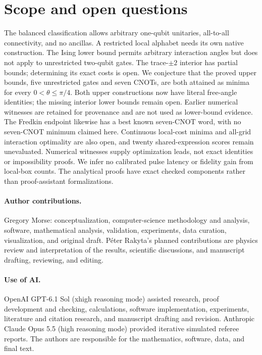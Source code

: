 \documentclass[a4paper,onecolumn,11pt,unpublished]{quantumarticle}
\begin{document}
\section{Scope and open questions}
The balanced classification allows arbitrary one-qubit unitaries, all-to-all
connectivity, and no ancillas. A restricted local alphabet needs its own
native construction. The Ising lower bound permits arbitrary interaction
angles but does not apply to unrestricted two-qubit gates. The trace-$\pm2$
interior has partial bounds; determining its exact costs is open.
We conjecture that the proved upper bounds, five unrestricted gates and
seven CNOTs, are both attained as minima for every $0<\theta\le\pi/4$.
Both upper constructions now have literal free-angle identities; the missing
interior lower bounds remain open. Earlier numerical witnesses are retained
for provenance and are not used as lower-bound evidence.
The Fredkin endpoint likewise has a best known seven-CNOT word, with no
seven-CNOT minimum claimed here.
Continuous local-cost minima and all-grid interaction optimality are also
open, and twenty shared-expression scores remain unevaluated. Numerical
witnesses supply optimization leads, not exact identities or impossibility
proofs. We infer no calibrated pulse latency or fidelity gain from local-box
counts. The analytical proofs have exact checked components rather than
proof-assistant formalizations.

\paragraph{Author contributions.}
Gregory Morse: conceptualization, computer-science methodology and analysis,
software, mathematical analysis, validation, experiments, data curation,
visualization, and original draft. P\'eter Rakyta's planned contributions are
physics review and interpretation of the results, scientific discussions,
and manuscript drafting, reviewing, and editing.

\paragraph{Use of AI.}
OpenAI GPT-6.1 Sol (xhigh reasoning mode) assisted research,
proof development and checking, calculations, software implementation,
experiments, literature and citation research, and manuscript drafting and
revision. Anthropic Claude Opus 5.5 (high reasoning mode) provided
iterative simulated referee reports. The authors are responsible for the
mathematics, software, data, and final text.


\end{document}
